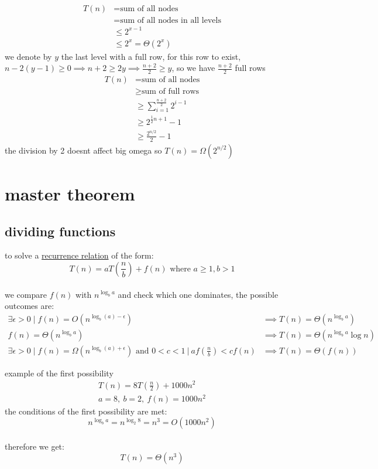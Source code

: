 \documentclass[a4paper,12pt]{article}
\begin{document}
\begin{my_example}
\begin{align*}
  T(n) &= \text{sum of all nodes}\\
  &= \text{sum of all nodes in all levels}\\
  &\le 2^{x-1}\\
  &\le 2^{x} = \Theta(2^x)
\end{align*}
we denote by \(y\) the last level with a full row, for this row to exist, \(n-2(y-1) \ge 0 \implies n+2 \ge 2y \implies \frac{n+2}{2} \ge y\), so we have \(\frac{n+2}{2}\) full rows\\
\begin{align*}
  T(n) &= \text{sum of all nodes}\\
  &\ge \text{sum of full rows}\\
  &\ge \sum_{i=1}^{\frac{n+2}{2}} 2^{i-1}\\
  &\ge 2^{\frac12n+1}-1\\
  &\ge \frac{2^{n/2}}{2}-1
\end{align*}
the division by 2 doesnt affect big omega so \(T(n) = \Omega\left(2^{n/2}\right)\)\\
\end{my_example}
\section{master theorem}
\label{sec:org56dacba}
\subsection{dividing functions}
\label{sec:org5cc032f}
to solve a \hyperref[sec:org4c65e1c]{recurrence relation} of the form:\\
\[ T(n) = aT\left(\frac{n}{b}\right) + f(n) \text{ where } a \geq 1, b > 1 \]\\
we compare \(f(n)\) with \(n^{\log_b{a}}\) and check which one dominates, the possible outcomes are:\\
\begin{align}
  \exists \epsilon > 0 \mid f(n) = O\left(n^{\log_b(a)-\epsilon}\right) &\implies T(n) = \Theta\left(n^{\log_b{a}}\right)\\
  f(n) = \Theta\left(n^{\log_b{a}}\right) &\implies T(n) = \Theta\left(n^{\log_b{a}}\log{n}\right)\\
  \exists \epsilon > 0 \mid f(n) = \Omega\left(n^{\log_b(a)+\epsilon}\right) \text{ and } 0 < c < 1 \ \Big|\ af\left(\frac{n}{b}\right) < cf(n) &\implies T(n) = \Theta(f(n))
\end{align}
\begin{my_example}
example of the first possibility\\
\begin{gather*}
  T(n) = 8T\left(\frac{n}{2}\right) + 1000n^2\\
  a = 8,\ b = 2,\ f(n) = 1000n^2
\end{gather*}
the conditions of the first possibility are met:\\
\[ n^{\log_b{a}} = n^{\log_2{8}} = n^3 = O\left(1000n^2\right) \]\\
therefore we get:\\
\[ T(n) = \Theta(n^3) \]\\
\end{my_example}
\end{document}
